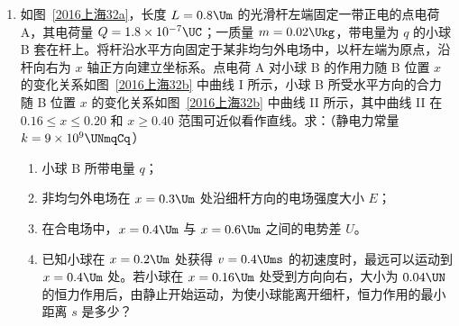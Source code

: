 \documentclass[\gkver]{gaokaozhenti}
\begin{document}
\begin{enumerate}
{由动能定理得

$E_{k} - \frac{1}{2}mv_{0}^{2} = mg\cdot\frac{1}{2}gt^{2} - Fs$，

以 $E_{k} = 78\UJ$ 和 $v_{0} = 8\Ums$ 代入得

$125t^{2} - 80t + 12 = 0$，

解得 $t_{1} = 0.4\Us$，$t_{2} = 0.24\Us$。
}

\item
如图~\ref{2016上海32a}，长度 $L = 0.8\Um$ 的光滑杆左端固定一带正电的点电荷 A，其电荷量 $Q = 1.8\times10^{-7}\UC$；一质量 $m = 0.02\Ukg$，带电量为 $q$ 的小球 B 套在杆上。将杆沿水平方向固定于某非均匀外电场中，以杆左端为原点，沿杆向右为 $x$ 轴正方向建立坐标系。点电荷 A 对小球 B 的作用力随 B 位置 $x$ 的变化关系如图~\ref{2016上海32b} 中曲线 I 所示，小球 B 所受水平方向的合力随 B 位置 $x$ 的变化关系如图~\ref{2016上海32b} 中曲线 II 所示，其中曲线 II 在 $0.16 \leq x \leq 0.20$ 和 $x \geq 0.40$ 范围可近似看作直线。求：（静电力常量 $k = 9\times10^{9}\UNmqCq$）
\begin{enumerate}
	\item
	小球 B 所带电量 $q$；
	\item
	非均匀外电场在 $x = 0.3\Um$ 处沿细杆方向的电场强度大小 $E$；
	\item
	在合电场中，$x = 0.4\Um$ 与 $x = 0.6\Um$ 之间的电势差 $U$。
	\item
	已知小球在 $x = 0.2\Um$ 处获得 $v = 0.4\Ums$ 的初速度时，最远可以运动到 $x = 0.4\Um$ 处。若小球在 $x = 0.16\Um$ 处受到方向向右，大小为 $0.04\UN$ 的恒力作用后，由静止开始运动，为使小球能离开细杆，恒力作用的最小距离 $s$ 是多少？
\end{enumerate}
\twopicture[labelA=2016上海32a, labelB=2016上海32b, numA=（a）, numB=（b）, align=right, wA=3.72cm, wB=11.32cm]
{}
{}
\end{enumerate}
\end{document}
